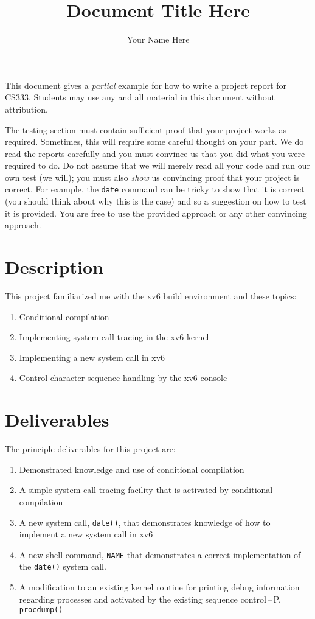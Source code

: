 \documentclass[12pt,letterpaper]{report}
\author{Your Name Here}
\title{Document Title Here}
\begin{document}
	\maketitle
	
	This document gives a \textit{partial} example for how to write a project report for CS333. Students may use any and all material in this document without attribution. 
	
	The testing section must contain sufficient proof that your project works as required. Sometimes, this will require some careful thought on your part. We do read the reports carefully and you must convince us that you did what you were required to do. Do not assume that we will merely read all your code and run our own test (we will); you must also \textit{show} us convincing proof that your project is correct. For example, the \texttt{date} command can be tricky to show that it is correct (you should think about why this is the case) and so a suggestion on how to test it is provided. You are free to use the provided approach or any other convincing approach.
	
	
	\section*{Description}
	
	This project familiarized me with the xv6 build environment and these topics:
	\begin{enumerate}
	\item Conditional compilation
	\item Implementing system call tracing in the xv6 kernel
	\item Implementing a new system call in xv6
	\item Control character sequence handling by the xv6 console
	\end{enumerate}
	
	
	\section*{Deliverables}
	
	The principle deliverables for this project are:
	\begin{enumerate}
	\item Demonstrated knowledge and use of conditional compilation
	\item A simple system call tracing facility that is activated by conditional compilation
	\item A new system call, \texttt{date()}, that demonstrates knowledge of how to implement a new system call in xv6
	\item A new shell command, \texttt{NAME} that demonstrates a correct implementation of the \texttt{date()} system call.
	\item A modification to an existing kernel routine for printing debug information regarding processes and activated by the existing sequence control\,--\,P, \texttt{procdump()}
	\end{enumerate}
	
\end{document}
